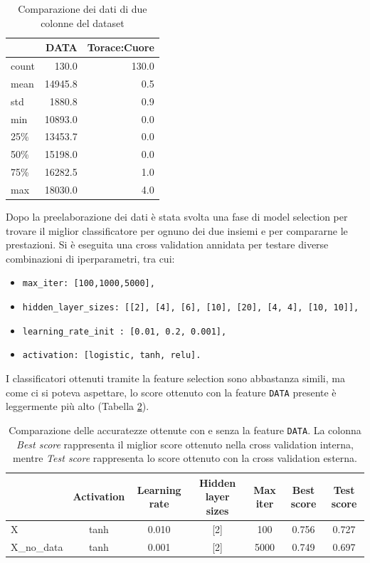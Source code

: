 \documentclass[12pt, twoside, letterpaper]{report}
\begin{document}
				\begin{table}
				\centering
				\begin{tabular}{lrr}
				\toprule
				{} &          DATA &  Torace:Cuore \\
				\midrule
				count &    130.0 &    130.0 \\
				mean  &  14945.8 &      0.5 \\
				std   &   1880.8 &      0.9 \\
				min   &  10893.0 &      0.0 \\
				25\%   &  13453.7 &      0.0 \\
				50\%   &  15198.0 &      0.0 \\
				75\%   &  16282.5 &      1.0 \\
				max   &  18030.0 &      4.0 \\
				\bottomrule
				\end{tabular}
				\caption{Comparazione dei dati di due colonne del dataset}
				\label{tab:differenza_data}
				\end{table}
				
				Dopo la preelaborazione dei dati è stata svolta una fase di model selection per trovare il miglior classificatore per ognuno dei due insiemi e per compararne le prestazioni. Si è eseguita una cross validation annidata per testare diverse combinazioni di iperparametri, tra cui: 
			\begin{itemize}
				\item \texttt{max\_iter: [100,1000,5000],}
	          	\item \texttt{hidden\_layer\_sizes: [[2], [4], [6], [10], [20], [4, 4], [10, 10]],}
	          	\item \texttt{learning\_rate\_init : [0.01, 0.2, 0.001],}
	          	\item \texttt{activation: [logistic, tanh, relu].}
			\end{itemize}
			I classificatori ottenuti tramite la feature selection sono abbastanza simili, ma come ci si poteva aspettare, lo score ottenuto con la feature \texttt{DATA} presente è leggermente più alto (Tabella \ref{tab:score_con_e_senza_data}). 

			\begin{table}
				\centering
				\begin{tabular}{lcccccc}
				\toprule
				 & Activation &  Learning rate & Hidden layer sizes &  Max iter &    Best score &  Test score \\
				\midrule
				X &       tanh &               0.010 &                [2] &       100 &  0.756 &    0.727 \\
				X\_no\_data &      tanh &               0.001 &                [2] &      5000 &  0.749 &    0.697 \\
				\bottomrule
				\end{tabular}
				\caption{Comparazione delle accuratezze ottenute con e senza la feature \texttt{DATA}. La colonna \textit{Best score} rappresenta il miglior score ottenuto nella cross validation interna, mentre \textit{Test score} rappresenta lo score ottenuto con la cross validation esterna.}
				\label{tab:score_con_e_senza_data}
			\end{table}	
			
\end{document}
